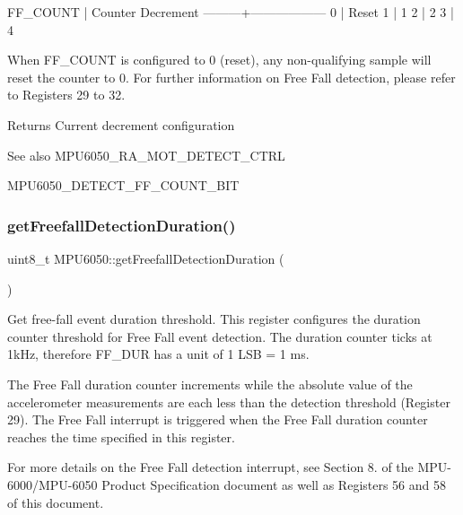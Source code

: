 \begin{DoxyPre}
FF\_COUNT | Counter Decrement
---------+------------------
0        | Reset
1        | 1
2        | 2
3        | 4
\end{DoxyPre}


When F\+F\+\_\+\+C\+O\+U\+NT is configured to 0 (reset), any non-\/qualifying sample will reset the counter to 0. For further information on Free Fall detection, please refer to Registers 29 to 32.

\begin{DoxyReturn}{Returns}
Current decrement configuration 
\end{DoxyReturn}
\begin{DoxySeeAlso}{See also}
M\+P\+U6050\+\_\+\+R\+A\+\_\+\+M\+O\+T\+\_\+\+D\+E\+T\+E\+C\+T\+\_\+\+C\+T\+RL 

M\+P\+U6050\+\_\+\+D\+E\+T\+E\+C\+T\+\_\+\+F\+F\+\_\+\+C\+O\+U\+N\+T\+\_\+\+B\+IT 
\end{DoxySeeAlso}
\mbox{\label{class_m_p_u6050_a3cff6b9613ad01aa1a51c287f5c5e329}} 
\subsubsection{\texorpdfstring{getFreefallDetectionDuration()}{getFreefallDetectionDuration()}}
{\footnotesize\ttfamily uint8\+\_\+t M\+P\+U6050\+::get\+Freefall\+Detection\+Duration (\begin{DoxyParamCaption}{ }\end{DoxyParamCaption})}

Get free-\/fall event duration threshold. This register configures the duration counter threshold for Free Fall event detection. The duration counter ticks at 1k\+Hz, therefore F\+F\+\_\+\+D\+UR has a unit of 1 L\+SB = 1 ms.

The Free Fall duration counter increments while the absolute value of the accelerometer measurements are each less than the detection threshold (Register 29). The Free Fall interrupt is triggered when the Free Fall duration counter reaches the time specified in this register.

For more details on the Free Fall detection interrupt, see Section 8. of the M\+P\+U-\/6000/\+M\+P\+U-\/6050 Product Specification document as well as Registers 56 and 58 of this document.

